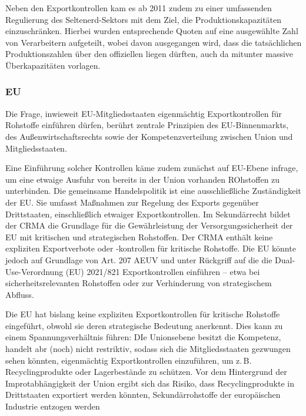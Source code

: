 \documentclass[12pt,a4paper,oneside]{book} %
\begin{document}
Neben den Exportkontrollen kam es ab 2011 zudem zu einer umfassenden Regulierung des Seltenerd-Sektors mit dem Ziel, die Produktionskapazitäten einzuschränken. Hierbei wurden entsprechende Quoten auf eine ausgewählte Zahl von Verarbeitern aufgeteilt, wobei davon ausgegangen wird, dass die tatsächlichen Produktionszahlen über den offiziellen liegen dürften, auch da mitunter massive Überkapazitäten vorlagen.\autocite{Top Commodty News 57, S. 1ff}


\subsubsection{EU}

Die Frage, inwieweit EU-Mitgliedsstaaten eigenmächtig Exportkontrollen für Rohstoffe einführen dürfen, berührt zentrale Prinzipien des EU-Binnenmarkts, des Außenwirtschaftsrechts sowie der Kompetenzverteilung zwischen Union und Mitgliedsstaaten.

Eine Einführung solcher Kontrollen käme zudem zunächst auf EU-Ebene infrage, um eine etwaige Ausfuhr von bereits in der Union vorhanden ROhstoffen zu unterbinden. Die gemeinsame Handelspolitik ist eine ausschließliche Zuständigkeit der EU. Sie umfasst Maßnahmen zur Regelung des Exports gegenüber Drittstaaten, einschließlich etwaiger Exportkontrollen. Im Sekundärrecht bildet der CRMA die Grundlage für die Gewährleistung der Versorgungssicherheit der EU mit kritischen und strategischen Rohstoffen. Der CRMA enthält keine expliziten Exportverbote oder -kontrollen für kritische Rohstoffe. Die EU könnte jedoch auf Grundlage von Art. 207 AEUV und unter Rückgriff auf die die Dual-Use-Verordnung (EU) 2021/821 Exportkontrollen einführen – etwa bei sicherheitsrelevanten Rohstoffen oder zur Verhinderung von strategischem Abfluss.

Die EU hat bislang keine expliziten Exportkontrollen für kritische Rohstoffe eingeführt, obwohl sie deren strategische Bedeutung anerkennt. Dies kann zu einem Spannungsverhältnis führen: DIe Unionsebene besitzt die Kompetenz, handelt abr (noch) nicht restriktiv, sodass sich die Mitgliedsstaaten gezwungen  sehen könnten, eigenmächtig Exportkontrollen einzuführen, um z. B. Recyclingprodukte oder Lagerbestände zu schützen. Vor dem Hintergrund der Improtabhängigkeit der Union ergibt sich das Risiko, dass Recyclingprodukte in Drittstaaten exportiert werden könnten, Sekundärrohstoffe der europäischen Industrie entzogen werden
\end{document}

